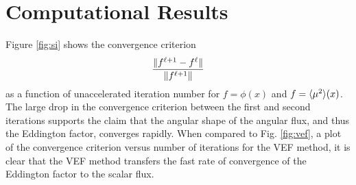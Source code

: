 
\section{Computational Results}

Figure \ref{fig:si} shows the convergence criterion
	\begin{equation}
		\frac{\| f^{\ell+1} - f^\ell \|}{\| f^{\ell+1} \|} 
	\end{equation}
as a function of unaccelerated iteration number for $f = \phi(x)$ and $f = \langle \mu^2 \rangle(x)$. The large drop in the convergence criterion between the first and second iterations supports the claim that the angular shape of the angular flux, and thus the Eddington factor, converges rapidly. When compared to Fig. \ref{fig:vef}, a plot of the convergence criterion versus number of iterations for the VEF method, it is clear that the VEF method transfers the fast rate of convergence of the Eddington factor to the scalar flux. 


